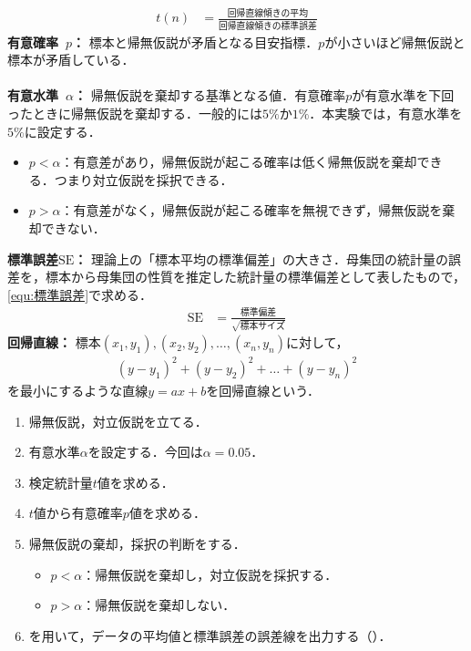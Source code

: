 \begin{oframed}
    \begin{align}
        t(n) & = \frac{\textrm{回帰直線傾きの平均}}{\textrm{回帰直線傾きの標準誤差}}\label{equ:t値}
    \end{align}
    \textbf{有意確率\ \(p\)：} 標本と帰無仮説が矛盾となる目安指標．\(p\)が小さいほど帰無仮説と標本が矛盾している．\\ \\
    \textbf{有意水準\ \(\alpha\)：} 帰無仮説を棄却する基準となる値．有意確率\(p\)が有意水準を下回ったときに帰無仮説を棄却する．一般的には\(5\%\)か\(1\%\)．本実験では，有意水準を\(5\%\)に設定する．
    \begin{itemize}
        \item \(p<\alpha\)：有意差があり，帰無仮説が起こる確率は低く帰無仮説を棄却できる．つまり対立仮説を採択できる．
        \item \(p>\alpha\)：有意差がなく，帰無仮説が起こる確率を無視できず，帰無仮説を棄却できない．
    \end{itemize}
    \textbf{標準誤差\(\textrm{SE}\)：} 理論上の「標本平均の標準偏差」の大きさ．母集団の統計量の誤差を，標本から母集団の性質を推定した統計量の標準偏差として表したもので，\eqref{equ:標準誤差}で求める．
    \begin{align}
        \textrm{SE} & =\frac{\textrm{標準偏差}}{\sqrt{標本サイズ}}\label{equ:標準誤差}
    \end{align}
    \textbf{回帰直線：} 標本\((x_1,y_1),(x_2,y_2),\dots ,(x_n,y_n)\)に対して，
    \begin{align*}
        (y-y_1)^2+(y-y_2)^2+\dots +(y-y_n)^2
    \end{align*}
    を最小にするような直線\(y=ax+b\)を回帰直線という．\\
    \hfill\cite[p.168, p.187, p.200\ -\ p.205]{Pythonで学ぶあたらしい統計学の教科書}
\end{oframed}
\begin{multicols}{2}
    \begin{enumerate}
        \item 帰無仮説，対立仮説を立てる．
        \item 有意水準\(\alpha\)を設定する．今回は\(\alpha=0.05\)．
        \item 検定統計量\(t\)値を求める．
        \item \(t\)値から有意確率\(p\)値を求める．
              \columnbreak
        \item 帰無仮説の棄却，採択の判断をする．
              \begin{itemize}
                  \item \(p<\alpha\)：帰無仮説を棄却し，対立仮説を採択する．
                  \item \(p>\alpha\)：帰無仮説を棄却しない．
              \end{itemize}
        \item \matlab を用いて，データの平均値と標準誤差の誤差線を出力する（）．
    \end{enumerate}
\end{multicols}
